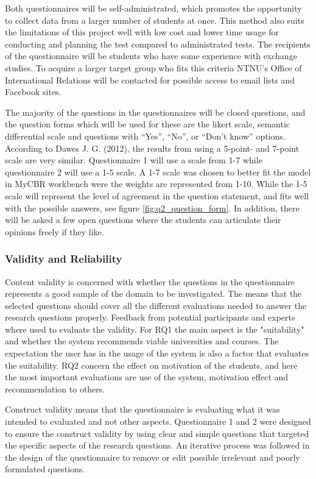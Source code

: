 Both questionnaires will be self-administrated, which promotes the opportunity to collect data from a larger number of students at once. This method also suits the limitations of this project well with low cost and lower time usage for conducting and planning the test compared to administrated tests. The recipients of the questionnaire will be students who have some experience with exchange studies. To acquire a larger target group who fits this criteria NTNU's Office of International Relations will be contacted for possible access to email lists and Facebook sites.

The majority of the questions in the questionnaires will be closed questions, and the question forms which will be used for these are the likert scale\cite{allen2007likert}, semantic differential scale\cite{osgood1952nature} and questions with \enquote{Yes}, \enquote{No}, or \enquote{Don't know} options. According to Dawes J. G. (2012)\cite{dawes2012data}, the results from using a 5-point- and 7-point scale are very similar. Questionnaire 1 will use a scale from 1-7 while questionnaire 2 will use a 1-5 scale. A 1-7 scale was chosen to better fit the model in MyCBR workbench were the weights are represented from 1-10. While the 1-5 scale will represent the level of agreement in the question statement, and fits well with the possible answers, see figure \ref{fig:q2_question_form}. In addition, there will be asked a few open questions where the students can articulate their opinions freely if they like.

\subsubsection{Validity and Reliability}
Content validity is concerned with whether the questions in the questionnaire represents a good sample of the domain to be investigated\cite{oates2005researching}. The means that the selected questions should cover all the different evaluations needed to answer the research questions properly. Feedback from potential participants and experts where used to evaluate the validity. For RQ1 the main aspect is the "suitability" and whether the system recommends viable universities and courses. The expectation the user has in the usage of the system is also a factor that evaluates the suitability. RQ2 concern the effect on motivation of the students, and here the most important evaluations are use of the system, motivation effect and recommendation to others.

Construct validity means that the questionnaire is evaluating what it was intended to evaluated and not other aspects\cite{oates2005researching}. Questionnaire 1 and 2 were designed to ensure the construct validity by using clear and simple questions that targeted the specific aspects of the research questions. An iterative process was followed in the design of the questionnaire to remove or edit possible irrelevant and poorly formulated questions. 


